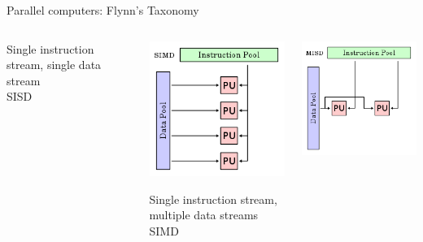 \documentclass{beamer}
\begin{document}
\begin{frame}{Parallel computers: Flynn's Taxonomy}
\begin{itemize}
\begin{columns}
\begin{column}{0.25\columnwidth}
		Single instruction stream, single data stream\\SISD
		\end{column}
			\begin{column}{0.25\columnwidth}
						\centering
				\small
	\includegraphics[width=\columnwidth]{SIMD.png}
	
	\alert<6>{Single instruction stream, multiple data streams\\SIMD}
	\end{column}
		\begin{column}{0.25\columnwidth}
					\centering
			\small
	\includegraphics[width=\columnwidth]{MISD.png}
			

\end{column}
\end{columns}
\end{itemize}
\end{frame}
\end{document}
